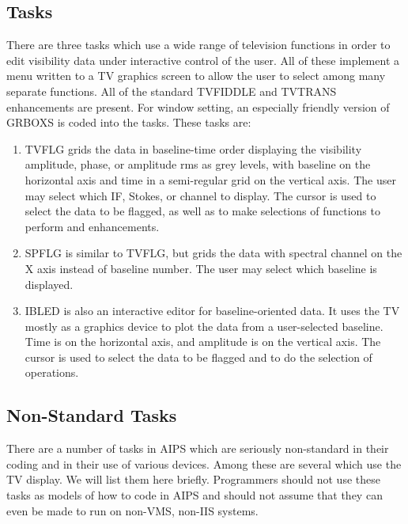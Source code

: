 \subsection{Tasks}
There are three tasks which use a wide range of television functions
in order to edit visibility data under interactive control of the
user. All of these implement a menu written to a TV graphics screen to
allow the user to select among many separate functions.  All of the
standard TVFIDDLE and TVTRANS
enhancements are present.  For window
setting, an especially friendly version of GRBOXS is coded into the
tasks.  These tasks are:

\begin{enumerate} %
\item TVFLG grids the data in baseline-time order displaying the
visibility amplitude, phase, or amplitude rms as grey levels, with
baseline on the horizontal axis and time in a semi-regular grid on the
vertical axis.  The user may select which IF, Stokes, or channel to
display.  The cursor is used to select the data to be flagged, as well
as to make selections of functions to perform and enhancements.
\item SPFLG is similar to TVFLG, but grids the data with spectral
channel on the X axis instead of baseline number.  The user may select
which baseline is displayed.
\item IBLED is also an interactive editor for baseline-oriented data.
It uses the TV mostly as a graphics device to plot the data from a
user-selected baseline.  Time is on the horizontal axis, and amplitude
is on the vertical axis.  The cursor is used to select the data to be
flagged and to do the selection of operations.
\end{enumerate} %

\subsection{Non-Standard Tasks}
There are a number of tasks in AIPS which are seriously non-standard
in their coding and in their use of various devices. Among these are
several which use the TV display.  We will list them here briefly.
Programmers should not use these tasks as models of how to code in
AIPS and should not assume that they can even be made to run on
non-VMS, non-IIS systems.

